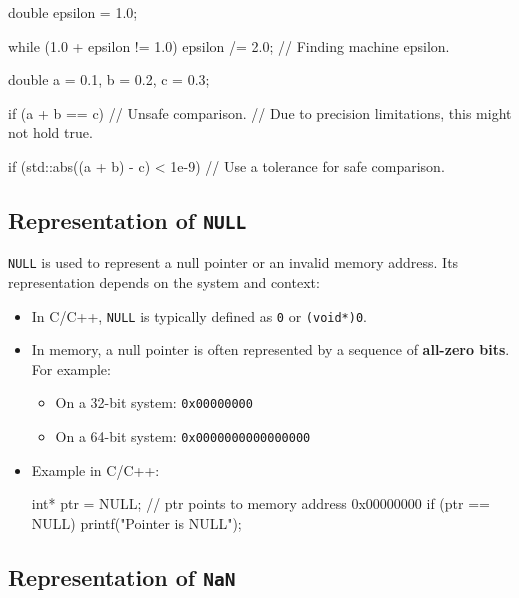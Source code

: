 \begin{exampleblock}
    \begin{codeblock}[language=C++]
double epsilon = 1.0;
        
while (1.0 + epsilon != 1.0) {
    epsilon /= 2.0; // Finding machine epsilon.
}
    \end{codeblock}
    \begin{codeblock}[language=C++]
double a = 0.1, b = 0.2, c = 0.3;

if (a + b == c) { // Unsafe comparison.
    // Due to precision limitations, this might not hold true.
}

if (std::abs((a + b) - c) < 1e-9) {
    // Use a tolerance for safe comparison.
}
    \end{codeblock}
\end{exampleblock}



\subsection{Representation of \texttt{NULL}}

\texttt{NULL} is used to represent a null pointer or an invalid memory address. Its representation depends on the system and context:

\begin{itemize}
    \item In C/C++, \texttt{NULL} is typically defined as \texttt{0} or \texttt{(void*)0}.
    \item In memory, a null pointer is often represented by a sequence of \textbf{all-zero bits}. For example:
    \begin{itemize}
        \item On a 32-bit system: \texttt{0x00000000}
        \item On a 64-bit system: \texttt{0x0000000000000000}
    \end{itemize}
    \newpage
    \item Example in C/C++:
\begin{exampleblock}
    \begin{codeblock}[language=C++]
int* ptr = NULL; // ptr points to memory address 0x00000000
if (ptr == NULL) {
    printf("Pointer is NULL\n");
}
    \end{codeblock}
\end{exampleblock}
\end{itemize}

\subsection{Representation of \texttt{NaN}}

